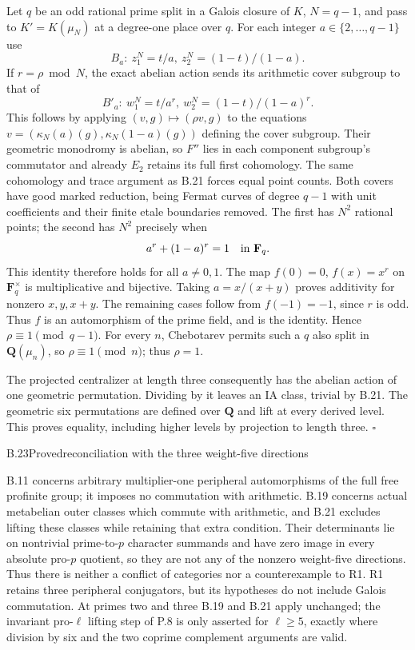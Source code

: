 Let $q$ be an odd rational prime split in a Galois closure of
$K$, $N=q-1$, and pass to $K'=K(\mu_N)$ at a degree-one place
over $q$. For each integer $a\in\{2,\ldots,q-1\}$ use
\[
 B_a:\ z_1^N=t/a,\ z_2^N=(1-t)/(1-a).
\]
If $r=\rho\bmod N$, the exact abelian action sends its
arithmetic cover subgroup to that of
\[
 B'_a:\ w_1^N=t/a^r,\ w_2^N=(1-t)/(1-a)^r.
\]
This follows by applying $(v,g)\mapsto(\rho v,g)$ to the
equations $v=(\kappa_N(a)(g),\kappa_N(1-a)(g))$ defining the
cover subgroup. Their geometric monodromy is abelian, so
$F''$ lies in each component subgroup's commutator and already
$E_2$ retains its full first cohomology. The same cohomology
and trace argument as B.21 forces equal point counts. Both
covers have good marked reduction, being Fermat curves of
degree $q-1$ with unit coefficients and their finite etale
boundaries removed. The first has $N^2$ rational points;
the second has $N^2$ precisely when
\[
                       a^r+(1-a)^r=1\quad\hbox{in }\mathbf F_q.
\]
This identity therefore holds for all $a\ne0,1$. The map
$f(0)=0$, $f(x)=x^r$ on $\mathbf F_q^\times$ is multiplicative
and bijective. Taking $a=x/(x+y)$ proves additivity for nonzero
$x,y,x+y$. The remaining cases follow from $f(-1)=-1$, since
$r$ is odd. Thus $f$ is an automorphism of the prime field,
and is the identity. Hence $\rho\equiv1\pmod{q-1}$.
For every $n$, Chebotarev permits such a $q$ also split in
$\mathbf Q(\mu_n)$, so $\rho\equiv1\pmod n$; thus $\rho=1$.

The projected centralizer at length three consequently has
the abelian action of one geometric permutation. Dividing by
it leaves an IA class, trivial by B.21. The geometric six
permutations are defined over $\mathbf Q$ and lift at every
derived level. This proves equality, including higher levels
by projection to length three. \hfill$\square$

\begin{statement}{B.23}{Proved}{reconciliation with the three weight-five directions}
\end{statement}
B.11 concerns arbitrary multiplier-one peripheral automorphisms
of the full free profinite group; it imposes no commutation
with arithmetic. B.19 concerns actual metabelian outer classes
which commute with arithmetic, and B.21 excludes lifting these
classes while retaining that extra condition. Their determinants
lie on nontrivial prime-to-$p$ character summands and have zero
image in every absolute pro-$p$ quotient, so they are not any
of the nonzero weight-five directions. Thus there is neither
a conflict of categories nor a counterexample to R1. R1 retains
three peripheral conjugators, but its hypotheses do not include
Galois commutation. At primes two and three B.19 and B.21 apply
unchanged; the invariant pro-$\ell$ lifting step of P.8 is
only asserted for $\ell\ge5$, exactly where division by six
and the two coprime complement arguments are valid.

